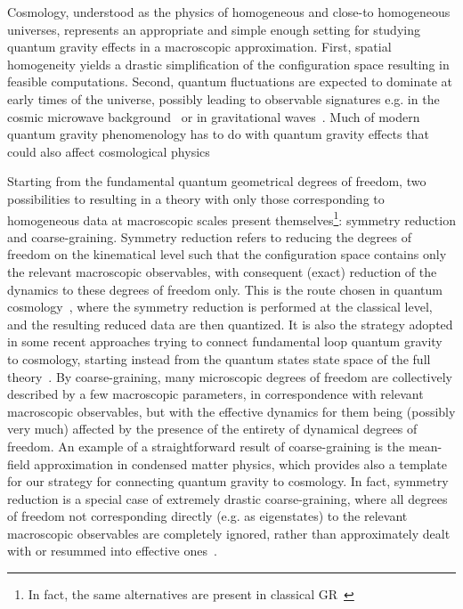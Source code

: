 \documentclass[11pt,a4paper]{article}
\begin{document}
Cosmology, understood as the physics of homogeneous and close-to homogeneous universes, represents an appropriate and simple enough setting for studying quantum gravity effects in a macroscopic approximation. First, spatial homogeneity yields a drastic simplification of the configuration space resulting in feasible computations. Second, quantum fluctuations are expected to dominate at early times of the universe, possibly leading to observable signatures e.g. in the cosmic microwave background~\cite{Ashtekar:2021kfp} or in gravitational waves~\cite{Calcagni:2019kzo}. Much of modern quantum gravity phenomenology has to do with quantum gravity effects that could also affect cosmological physics~\cite{Addazi:2021xuf} 

Starting from the fundamental quantum geometrical degrees of freedom, two possibilities to resulting in a theory with only those corresponding to homogeneous data at macroscopic scales present themselves\footnote{In fact, the same alternatives are present in classical GR~\cite{Buchert:2007ik,Buchert:2015iva}}: symmetry reduction and coarse-graining. Symmetry reduction refers to reducing the degrees of freedom on the kinematical level such that the configuration space contains only the relevant macroscopic observables, with consequent (exact) reduction of the dynamics to these degrees of freedom only. This is the route chosen in quantum cosmology~\cite{Ashtekar:2011ni}, where the symmetry reduction is performed at the classical level, and the resulting reduced data are then quantized. It is also the strategy adopted in some recent approaches trying to connect fundamental loop quantum gravity to cosmology, starting instead from the quantum states state space of the full theory~\cite{Alesci:2016gub}. By coarse-graining, many microscopic degrees of freedom are collectively described by a few macroscopic parameters, in correspondence with relevant macroscopic observables, but with the effective dynamics for them being (possibly very much) affected by the presence of the entirety of dynamical degrees of freedom. An example of a straightforward result of coarse-graining is the mean-field approximation in condensed matter physics, which provides also a template for our strategy for connecting quantum gravity to cosmology. In fact, symmetry reduction is a special case of extremely drastic coarse-graining, where all degrees of freedom not corresponding directly (e.g. as eigenstates) to the relevant macroscopic observables are completely ignored, rather than approximately dealt with or resummed into effective ones~\cite{Oriti:2016qtz}. 
\end{document}
